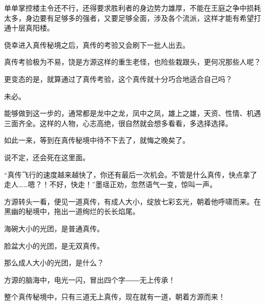 \begin{this_body}
单单掌控楼主令还不行，还得要求胜利者的身边势力雄厚，不能在王庭之争中损耗太多，身边要有足够多的强者，又要足够全面，涉及各个流派，这样才能有希望打通十层真阳楼。

侥幸进入真传秘境之后，真传的考验又会刷下一批人出去。

真传考验极为不易，饶是方源这样的重生老怪，也险些栽跟头，更何况那些人呢？

更变态的是，就算通过了真传考验，这个真传就十分巧合地适合自己吗？

未必。

能够做到这一步的，通常都是龙中之龙，凤中之凤，雄上之雄，天资、性情、机遇三面齐全。这样的人物，心志高绝，很自然就会想多看看，多选择选择。

如此一来，等到在真传秘境中待不下去了，就悔之晚矣了。

说不定，还会死在这里面。

“真传飞行的速度越来越快了，你还有最后一次机会。不管是什么真传，快点拿了走人……嗯？！不好，快走！”墨瑶正劝，忽然语气一变，惊叫一声。

方源转头一看，便见一道真传，有成人大小，绽放七彩玄光，朝着他呼啸而来。在黑幽的秘境中，拖出一道绚烂的长长焰尾。

海碗大小的光团，是普通真传。

脸盆大小的光团，是无双真传。

那么成人大小的光团，是什么？

方源的脑海中，电光一闪，冒出四个字――无上传承！

整个真传秘境中，只有三道无上真传，现在就有一道，朝着方源而来！

\end{this_body}

